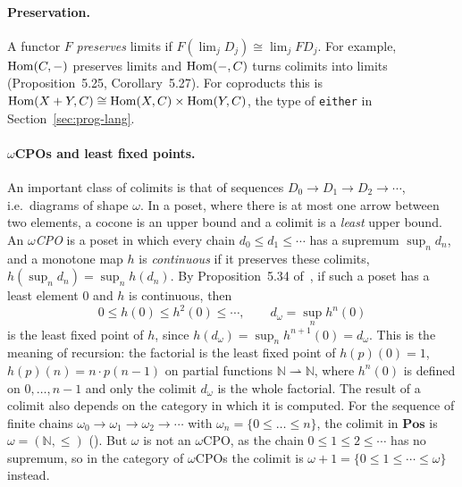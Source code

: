 \paragraph{Preservation.} A functor $F$ \emph{preserves} limits if
$F(\lim_j D_j) \cong \lim_j F D_j$. For example, $\operatorname{Hom}(C, -)$ preserves limits
and $\operatorname{Hom}(-, C)$ turns colimits into limits (Proposition~5.25,
Corollary~5.27). For coproducts this is $\operatorname{Hom}(X + Y, C) \cong \operatorname{Hom}(X, C)
\times \operatorname{Hom}(Y, C)$, the type of \texttt{either} in
Section~\ref{sec:prog-lang}.

\paragraph{$\omega$CPOs and least fixed points.} An important class of
colimits is that of sequences $D_0 \to D_1 \to D_2 \to \cdots$, i.e.\ diagrams
of shape $\omega$. In a poset, where there is at most one arrow between two
elements, a cocone is an upper bound and a colimit is a \emph{least} upper
bound. An \emph{$\omega$CPO} is a poset in which every chain $d_0 \le d_1 \le
\cdots$ has a supremum $\sup_n d_n$, and a monotone map $h$ is
\emph{continuous} if it preserves these colimits, $h(\sup_n d_n) = \sup_n
h(d_n)$. By Proposition~5.34 of~\cite{Awodey10}, if such a poset has a least
element $0$ and $h$ is continuous, then
\[
  0 \le h(0) \le h^2(0) \le \cdots, \qquad d_\omega = \sup_n h^n(0)
\]
is the least fixed point of $h$, since $h(d_\omega) = \sup_n h^{n+1}(0) =
d_\omega$. This is the meaning of recursion: the factorial is the least fixed
point of $h(p)(0) = 1$, $h(p)(n) = n \cdot p(n-1)$ on partial functions
$\mathbb{N} \rightharpoonup \mathbb{N}$, where $h^n(0)$ is defined on $0,
\dots, n-1$ and only the colimit $d_\omega$ is the whole factorial.
The result of a colimit also depends on the category in which it is computed.
For the sequence of finite chains
$\omega_0 \to \omega_1 \to \omega_2 \to \cdots$ with $\omega_n = \{0 \le \dots
\le n\}$, the colimit in $\mathbf{Pos}$ is $\omega = (\mathbb{N}, \le)$
(). But $\omega$ is not an $\omega$CPO, as the chain $0 \le 1 \le 2
\le \cdots$ has no supremum, so in the category of $\omega$CPOs the colimit is
$\omega + 1 = \{0 \le 1 \le \cdots \le \omega\}$ instead.

